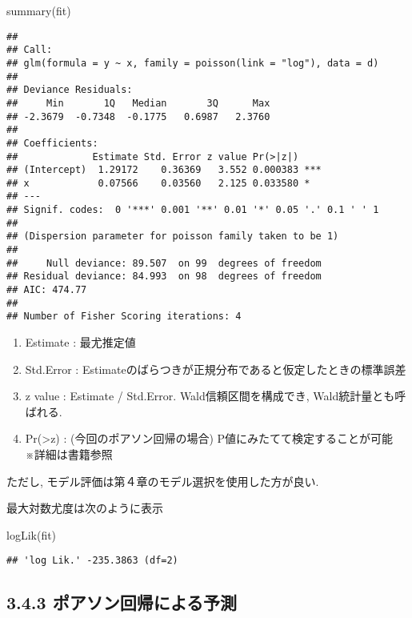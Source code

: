 \documentclass[
]{article}
\newenvironment{Shaded}{\begin{snugshade}}{\end{snugshade}}
\newcommand{\FunctionTok}[1]{\textcolor[rgb]{0.00,0.00,0.00}{#1}}
\newcommand{\NormalTok}[1]{#1}
\providecommand{\tightlist}{%
  \setlength{\itemsep}{0pt}\setlength{\parskip}{0pt}}
\begin{document}
\begin{Shaded}
\begin{Highlighting}[]
\FunctionTok{summary}\NormalTok{(fit)}
\end{Highlighting}
\end{Shaded}

\begin{verbatim}
## 
## Call:
## glm(formula = y ~ x, family = poisson(link = "log"), data = d)
## 
## Deviance Residuals: 
##     Min       1Q   Median       3Q      Max  
## -2.3679  -0.7348  -0.1775   0.6987   2.3760  
## 
## Coefficients:
##             Estimate Std. Error z value Pr(>|z|)    
## (Intercept)  1.29172    0.36369   3.552 0.000383 ***
## x            0.07566    0.03560   2.125 0.033580 *  
## ---
## Signif. codes:  0 '***' 0.001 '**' 0.01 '*' 0.05 '.' 0.1 ' ' 1
## 
## (Dispersion parameter for poisson family taken to be 1)
## 
##     Null deviance: 89.507  on 99  degrees of freedom
## Residual deviance: 84.993  on 98  degrees of freedom
## AIC: 474.77
## 
## Number of Fisher Scoring iterations: 4
\end{verbatim}

\begin{enumerate}
\def\labelenumi{\arabic{enumi}.}
\tightlist
\item
  Estimate : 最尤推定値
\item
  Std.Error : Estimateのばらつきが正規分布であると仮定したときの標準誤差
\item
  z value : Estimate / Std.Error. Wald信頼区間を構成でき,
  Wald統計量とも呼ばれる.
\item
  Pr(\textgreater\textbar z\textbar) : (今回のポアソン回帰の場合)
  P値にみたてて検定することが可能　※詳細は書籍参照
\end{enumerate}

ただし, モデル評価は第４章のモデル選択を使用した方が良い.

最大対数尤度は次のように表示

\begin{Shaded}
\begin{Highlighting}[]
\FunctionTok{logLik}\NormalTok{(fit)}
\end{Highlighting}
\end{Shaded}

\begin{verbatim}
## 'log Lik.' -235.3863 (df=2)
\end{verbatim}

\hypertarget{ux30ddux30a2ux30bdux30f3ux56deux5e30ux306bux3088ux308bux4e88ux6e2c}{%
\subsection{3.4.3
ポアソン回帰による予測}\label{ux30ddux30a2ux30bdux30f3ux56deux5e30ux306bux3088ux308bux4e88ux6e2c}}
\end{document}
